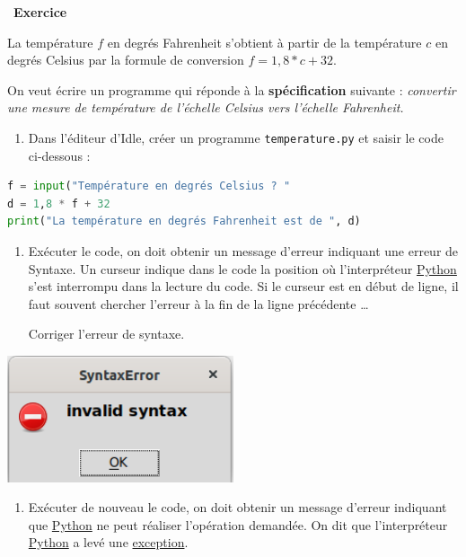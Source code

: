 \documentclass[
  11pt,
]{article}
\newcommand{\passthrough}[1]{#1}
\providecommand{\tightlist}{%
  \setlength{\itemsep}{0pt}\setlength{\parskip}{0pt}}
\newcounter{exo}
\newenvironment{exercice}[1]
{\par \medskip   \addtocounter{exo}{1} \noindent  
\begin{bclogo}[arrondi =0.1,   noborder = true, logo=\bccrayon, marge=4]{~\textbf{Exercice} \textbf{\theexo} {\itshape #1} }  \par}
{
\end{bclogo}
 \par \bigskip }
\newcounter{def}
\newcounter{prog}
\begin{document}
\begin{exercice}{}

La température \(f\) en degrés Fahrenheit s'obtient à partir de la
température \(c\) en degrés Celsius par la formule de conversion
\(f=1,8 * c + 32\).

On veut écrire un programme qui réponde à la \textbf{spécification}
suivante : \emph{convertir une mesure de température de l'échelle
Celsius vers l'échelle Fahrenheit.}

\begin{enumerate}
\def\labelenumi{\arabic{enumi}.}
\tightlist
\item
  Dans l'éditeur d'Idle, créer un programme
  \passthrough{\lstinline!temperature.py!} et saisir le code ci-dessous
  :
\end{enumerate}

\begin{lstlisting}[language=Python]
f = input("Température en degrés Celsius ? "
d = 1,8 * f + 32
print("La température en degrés Fahrenheit est de ", d)
\end{lstlisting}

\begin{enumerate}
\def\labelenumi{\arabic{enumi}.}
\setcounter{enumi}{1}
\item
  Exécuter le code, on doit obtenir un message d'erreur indiquant une
  erreur de Syntaxe. Un curseur indique dans le code la position où
  l'interpréteur
  \href{https://docs.python.org/3/tutorial/datastructures.html}{Python}
  s'est interrompu dans la lecture du code. Si le curseur est en début
  de ligne, il faut souvent chercher l'erreur à la fin de la ligne
  précédente \ldots{}

  Corriger l'erreur de syntaxe.
\end{enumerate}

\includegraphics[width=0.5\textwidth,height=\textheight]{images/syntax_error.png}\\

\begin{enumerate}
\def\labelenumi{\arabic{enumi}.}
\setcounter{enumi}{2}
\tightlist
\item
  Exécuter de nouveau le code, on doit obtenir un message d'erreur
  indiquant que
  \href{https://docs.python.org/3/tutorial/datastructures.html}{Python}
  ne peut réaliser l'opération demandée. On dit que l'interpréteur
  \href{https://docs.python.org/3/tutorial/datastructures.html}{Python}
  a levé une
  \href{https://docs.python.org/3.5/tutorial/errors.html}{exception}.
\end{enumerate}


\end{exercice}
\end{document}
